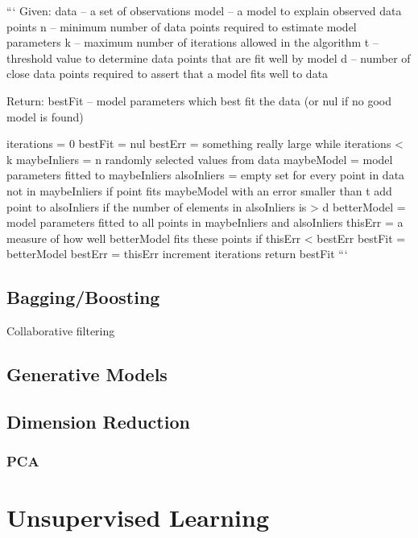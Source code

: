 {{{{{{```
Given:
    data – a set of observations
    model – a model to explain observed data points
    n – minimum number of data points required to estimate model parameters
    k – maximum number of iterations allowed in the algorithm
    t – threshold value to determine data points that are fit well by model 
    d – number of close data points required to assert that a model fits well to data

Return:
    bestFit – model parameters which best fit the data (or nul if no good model is found)

iterations = 0
bestFit = nul
bestErr = something really large
while iterations < k {
    maybeInliers = n randomly selected values from data
    maybeModel = model parameters fitted to maybeInliers
    alsoInliers = empty set
    for every point in data not in maybeInliers {
        if point fits maybeModel with an error smaller than t
             add point to alsoInliers
    }
    if the number of elements in alsoInliers is > d {
        betterModel = model parameters fitted to all points in maybeInliers and alsoInliers
        thisErr = a measure of how well betterModel fits these points
        if thisErr < bestErr {
            bestFit = betterModel
            bestErr = thisErr
        }
    }
    increment iterations
}
return bestFit
```



\section{Bagging/Boosting}

Collaborative filtering

\section{Generative Models}

\section{Dimension Reduction}

\subsection{PCA}

\chapter{Unsupervised Learning}

}}}}}}
